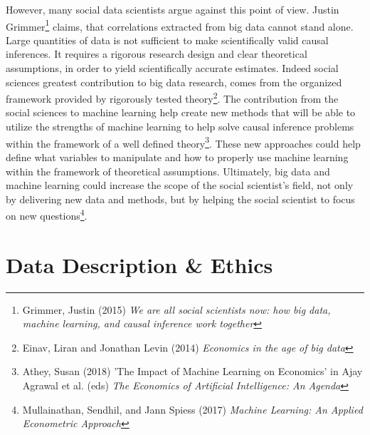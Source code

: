 \documentclass[12pt,a4paper]{article}
\begin{document}
However, many social data scientists argue against this point of view. Justin Grimmer\footnote{Grimmer, Justin (2015) \textit{We are all social scientists now: how big data, machine learning, and causal inference work together}} claims, that correlations extracted from big data cannot stand alone. Large quantities of data is not sufficient to make scientifically valid causal inferences. It requires a rigorous research design and clear theoretical assumptions, in order to yield scientifically accurate estimates. Indeed social sciences greatest contribution to big data research, comes from the organized framework provided by rigorously tested theory\footnote{Einav, Liran and Jonathan Levin (2014) \textit{Economics in the age of big data}}.\newline
The contribution from the social sciences to machine learning help create new methods that will be able to utilize the strengths of machine learning to help solve causal inference problems within the framework of a well defined theory\footnote{Athey, Susan (2018) 'The Impact of Machine Learning on Economics' in Ajay Agrawal et al. (eds) \textit{The Economics of Artificial Intelligence: An Agenda}}. These new approaches could help define what variables to manipulate and how to properly use machine learning within the framework of theoretical assumptions. Ultimately, big data and machine learning could increase the scope of the social scientist's field, not only by delivering new data and methods, but by helping the social scientist to focus on new questions\footnote{Mullainathan, Sendhil, and Jann Spiess (2017) \textit{Machine Learning: An Applied Econometric Approach}}.

\section{Data Description \& Ethics}
\end{document}
